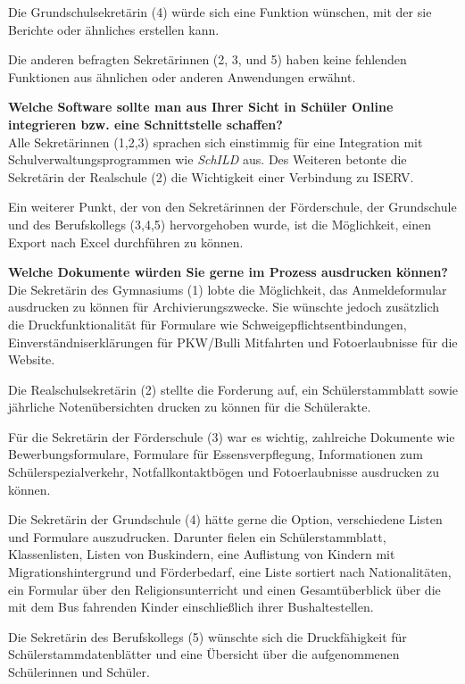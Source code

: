 Die Grundschulsekretärin (4) würde sich eine Funktion wünschen, mit der sie Berichte oder ähnliches erstellen kann.

Die anderen befragten Sekretärinnen (2, 3, und 5) haben keine fehlenden Funktionen aus ähnlichen oder anderen Anwendungen erwähnt.

\textbf{Welche Software sollte man aus Ihrer Sicht in Schüler Online integrieren bzw. eine Schnittstelle schaffen?}\\
Alle Sekretärinnen (1,2,3) sprachen sich einstimmig für eine Integration mit Schulverwaltungsprogrammen wie \textit{SchILD} aus. Des Weiteren betonte die Sekretärin der Realschule (2) die Wichtigkeit einer Verbindung zu ISERV.

Ein weiterer Punkt, der von den Sekretärinnen der Förderschule, der Grundschule und des Berufskollegs (3,4,5) hervorgehoben wurde, ist die Möglichkeit, einen Export nach Excel durchführen zu können.

\textbf{Welche Dokumente würden Sie gerne im Prozess ausdrucken können?}\\
Die Sekretärin des Gymnasiums (1) lobte die Möglichkeit, das Anmeldeformular ausdrucken zu können für Archivierungszwecke. Sie wünschte jedoch zusätzlich die Druckfunktionalität für Formulare wie Schweigepflichtsentbindungen, Einverständniserklärungen für PKW/Bulli Mitfahrten und Fotoerlaubnisse für die Website.

Die Realschulsekretärin (2) stellte die Forderung auf, ein Schülerstammblatt sowie jährliche Notenübersichten drucken zu können für die Schülerakte.

Für die Sekretärin der Förderschule (3) war es wichtig, zahlreiche Dokumente wie Bewerbungsformulare, Formulare für Essensverpflegung, Informationen zum Schülerspezialverkehr, Notfallkontaktbögen und Fotoerlaubnisse ausdrucken zu können.

Die Sekretärin der Grundschule (4) hätte gerne die Option, verschiedene Listen und Formulare auszudrucken. Darunter fielen ein Schülerstammblatt, Klassenlisten, Listen von Buskindern, eine Auflistung von Kindern mit Migrationshintergrund und Förderbedarf, eine Liste sortiert nach Nationalitäten, ein Formular über den Religionsunterricht und einen Gesamtüberblick über die mit dem Bus fahrenden Kinder einschließlich ihrer Bushaltestellen.

Die Sekretärin des Berufskollegs (5) wünschte sich die Druckfähigkeit für Schülerstammdatenblätter und eine Übersicht über die aufgenommenen Schülerinnen und Schüler.

